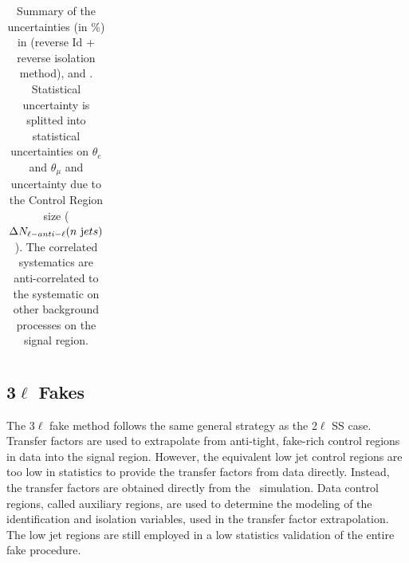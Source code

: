 \begin{table}
\begin{center}
{\begin{tabular}{|l|l|ccc|ccc|}
\hline \end{tabular}}
\caption{ Summary of the uncertainties (in \%) in \ee (reverse Id + reverse isolation
  method), \mumu and \emu. Statistical uncertainty is splitted into statistical
  uncertainties on $\theta_{e}$ and $\theta_{\mu}$ and uncertainty due to the
  Control Region size ($\Delta N_{\ell-anti-{\ell}}(n~ {\rm jets})$). The
  correlated systematics are anti-correlated to the systematic on other
  background processes on the signal region.\label{tab:uncertainties}}
\end{center}  
 \end{table}





\subsection{3$\ell$ Fakes}

The 3$\ell$ fake method follows the same general strategy as the 2$\ell$ SS case. Transfer factors are used to extrapolate from anti-tight, fake-rich control regions in data  into the signal region.  However, the equivalent low jet control regions are too low in statistics to provide the transfer factors from data directly. Instead, the transfer factors are obtained directly from the \ttbar\ simulation. Data control regions, called auxiliary regions, are used to determine the modeling of the identification and isolation variables, used in the transfer factor extrapolation. The low jet regions are still employed in a low statistics validation of the entire fake procedure. 


